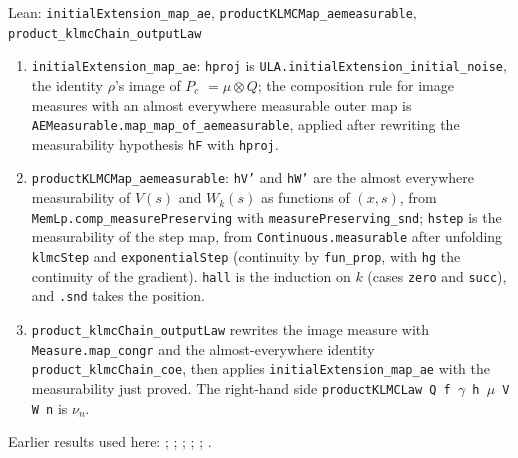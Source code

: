\documentclass[11pt,a4paper]{article}
\begin{document}
\begin{leanbox}{Lean: \texttt{initialExtension\_\allowbreak{}map\_\allowbreak{}ae}, \texttt{productKLMCMap\_\allowbreak{}aemeasurable}, \texttt{product\_\allowbreak{}klmcChain\_\allowbreak{}outputLaw}}
\begin{enumerate}
\item \texttt{initial\allowbreak{}Extension\_\allowbreak{}map\_\allowbreak{}ae}: \texttt{hproj} is \texttt{ULA.\allowbreak{}initial\allowbreak{}Extension\_\allowbreak{}initial\_\allowbreak{}noise}, the identity \(\rho\)'s image of \(P_c\) \(=\mu\otimes Q\); the composition rule for image measures with an almost everywhere measurable outer map is \texttt{AEMeasurable.\allowbreak{}map\_\allowbreak{}map\_\allowbreak{}of\_\allowbreak{}aemeasurable}, applied after rewriting the measurability hypothesis \texttt{h\allowbreak{}F} with \texttt{hproj}.

\item \texttt{product\allowbreak{}KLMCMap\_\allowbreak{}aemeasurable}: \texttt{h\allowbreak{}V'} and \texttt{h\allowbreak{}W'} are the almost everywhere measurability of \(V(s)\) and \(W_k(s)\) as functions of \((x,s)\), from \texttt{Mem\allowbreak{}Lp.\allowbreak{}comp\_\allowbreak{}measure\allowbreak{}Preserving} with \texttt{measure\allowbreak{}Preserving\_\allowbreak{}snd}; \texttt{hstep} is the measurability of the step map, from \texttt{Continuous.\allowbreak{}measurable} after unfolding \texttt{klmc\allowbreak{}Step} and \texttt{exponential\allowbreak{}Step} (continuity by \texttt{fun\_\allowbreak{}prop}, with \texttt{hg} the continuity of the gradient). \texttt{hall} is the induction on \(k\) (cases \texttt{zero} and \texttt{succ}), and \texttt{.\allowbreak{}snd} takes the position.

\item \texttt{product\_\allowbreak{}klmc\allowbreak{}Chain\_\allowbreak{}output\allowbreak{}Law} rewrites the image measure with \texttt{Measure.\allowbreak{}map\_\allowbreak{}congr} and the almost-everywhere identity \texttt{product\_\allowbreak{}klmc\allowbreak{}Chain\_\allowbreak{}coe}, then applies \texttt{initial\allowbreak{}Extension\_\allowbreak{}map\_\allowbreak{}ae} with the measurability just proved. The right-hand side \texttt{product\allowbreak{}KLMCLaw Q f \ensuremath{\gamma} h \ensuremath{\mu} V W n} is \(\nu_n\).

\end{enumerate}
\end{leanbox}


Earlier results used here: \cite[Section~3.13.2]{LangevinLean2026ULASC}; \cite[Section~3.17.1]{LangevinLean2026ULASC}; \cite[Section~3.17.2]{LangevinLean2026ULASC}; \cite[Section~3.22.19]{LangevinLean2026ULASC}; \cite[Section~3.22.2]{LangevinLean2026ULASC}; \cite[Section~3.22.9]{LangevinLean2026ULASC}.
\end{document}
